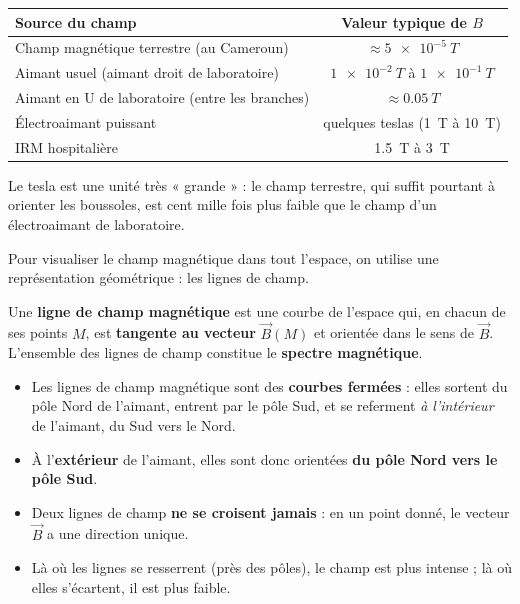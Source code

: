 \documentclass[11pt]{article}
\newcounter{popsec}
\newcounter{popsub}
\newcommand{\courssub}[1]{%
  \stepcounter{popsub}%
  \par\vspace{9pt}\noindent{\popxbold\fontsize{11.5}{13}\selectfont\color{popink}{\color{poporange}\thepopsec.\thepopsub}\hspace{6pt}#1}\par\nopagebreak\vspace{4pt}
}
\begin{document}
\begin{exemplebox}
\begin{center}
\begin{tabularx}{\linewidth}{|X|c|}
\hline
\rowcolor{popblueL} \textbf{Source du champ} & \textbf{Valeur typique de $B$} \\
\hline
Champ magnétique terrestre (au Cameroun) & $\approx \SI{5e-5}{T}$ \\
\hline
Aimant usuel (aimant droit de laboratoire) & $\SI{1e-2}{T}$ à $\SI{1e-1}{T}$ \\
\hline
Aimant en U de laboratoire (entre les branches) & $\approx \SI{0,05}{T}$ \\
\hline
Électroaimant puissant & quelques teslas (\SI{1}{T} à \SI{10}{T}) \\
\hline
IRM hospitalière & \SI{1,5}{T} à \SI{3}{T} \\
\hline
\end{tabularx}
\end{center}
Le tesla est une unité très « grande » : le champ terrestre, qui suffit pourtant à orienter les boussoles, est cent mille fois plus faible que le champ d'un électroaimant de laboratoire.
\end{exemplebox}

\courssub{Lignes de champ magnétique}

Pour visualiser le champ magnétique dans tout l'espace, on utilise une représentation géométrique : les lignes de champ.

\begin{definition}
Une \textbf{ligne de champ magnétique} est une courbe de l'espace qui, en chacun de ses points $M$, est \textbf{tangente au vecteur} $\vec{B}(M)$ et orientée dans le sens de $\vec{B}$. L'ensemble des lignes de champ constitue le \textbf{spectre magnétique}.
\end{definition}

\begin{propriete}
\begin{itemize}
\item Les lignes de champ magnétique sont des \textbf{courbes fermées} : elles sortent du pôle Nord de l'aimant, entrent par le pôle Sud, et se referment \emph{à l'intérieur} de l'aimant, du Sud vers le Nord.
\item À l'\textbf{extérieur} de l'aimant, elles sont donc orientées \textbf{du pôle Nord vers le pôle Sud}.
\item Deux lignes de champ \textbf{ne se croisent jamais} : en un point donné, le vecteur $\vec{B}$ a une direction unique.
\item Là où les lignes se resserrent (près des pôles), le champ est plus intense ; là où elles s'écartent, il est plus faible.
\end{itemize}
\end{propriete}
\end{document}

